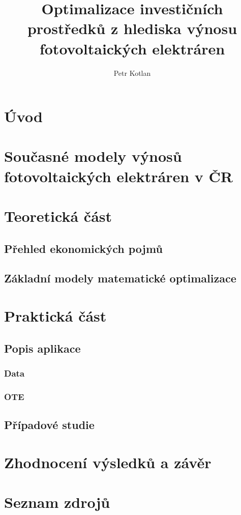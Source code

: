 \documentclass[a4paper, 12pt]{report}
\author{Petr Kotlan}
\title{Optimalizace investičních prostředků z hlediska
výnosu fotovoltaických elektráren}
\date{}
\begin{document}



\tableofcontents

\chapter*{Úvod}

\chapter{Současné modely výnosů fotovoltaických elektráren v ČR}

\chapter{Teoretická část}

\section{Přehled ekonomických pojmů}

\section{Základní modely matematické optimalizace}

\chapter{Praktická část}

\section{Popis aplikace}

\subsection{Data}

\subsection*{OTE}


\section{Případové studie}

\chapter{Zhodnocení výsledků a závěr}

\chapter*{Seznam zdrojů}
\end{document}
